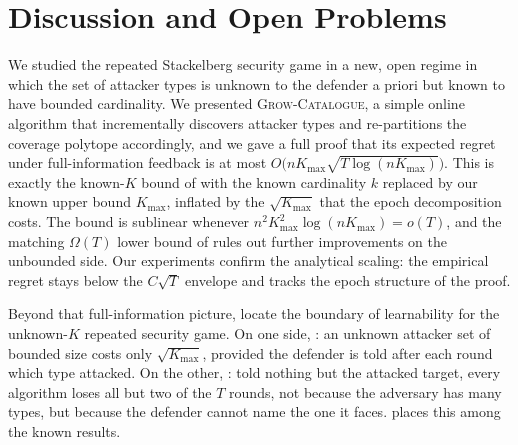 \documentclass[letterpaper,9pt,twocolumn]{extarticle}
\newcommand{\Kmax}{K_{\max}}
\theoremstyle{plain}
\theoremstyle{definition}
\theoremstyle{remark}
\begin{document}
\section{Discussion and Open Problems}
\label{sec:conc2}
\label{sec:conc}

We studied the repeated Stackelberg security game in a new, open regime
in which the set of attacker types is unknown to the defender a priori
but known to have bounded cardinality. We presented \textsc{Grow-Catalogue},
a simple online algorithm that incrementally discovers attacker types and
re-partitions the coverage polytope accordingly, and we gave a full proof
that its expected regret under full-information feedback is at most
$O\!\bigl(n\Kmax\sqrt{T\log (n\Kmax)}\bigr)$. This is exactly the known-$K$
bound of \citet[Theorem 5.1]{balcan2015} with the known cardinality $k$
replaced by our known upper bound $\Kmax$, inflated by the $\sqrt{\Kmax}$ that
the epoch decomposition costs.
The bound is sublinear whenever $n^2\Kmax^2\log(n\Kmax)=o(T)$, and
the matching $\Omega(T)$ lower bound of \citet[Theorem 7.1]{balcan2015}
rules out further improvements on the unbounded side. Our experiments
confirm the analytical scaling: the empirical regret stays below the
$C\sqrt T$ envelope and tracks the epoch structure of the proof.

Beyond that full-information picture,  locate
the boundary of learnability for the
unknown-$K$ repeated security game. On one side, : an unknown
attacker set of bounded size costs only $\sqrt{\Kmax}$, provided the defender
is told after each round which type attacked. On the other,
: told nothing but the attacked target, every algorithm
loses all but two of the $T$ rounds, not because the adversary has many
types, but because the defender cannot name the one it faces.  places this among the
known results.
\end{document}
